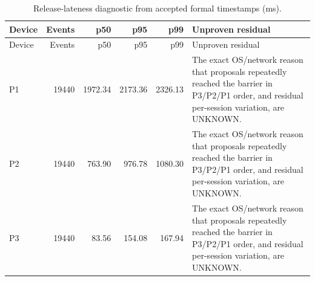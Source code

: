 \begin{longtable}{lrrrrp{65mm}}
\caption{Release-lateness diagnostic from accepted formal timestamps (ms).}\label{tab:release}\\
\toprule
Device & Events & p50 & p95 & p99 & Unproven residual \\
\midrule
\endfirsthead
\toprule
Device & Events & p50 & p95 & p99 & Unproven residual \\
\midrule
\endhead
P1 & 19440 & 1972.34 & 2173.36 & 2326.13 & The exact OS/network reason that proposals repeatedly reached the barrier in P3/P2/P1 order, and residual per-session variation, are UNKNOWN. \\
P2 & 19440 & 763.90 & 976.78 & 1080.30 & The exact OS/network reason that proposals repeatedly reached the barrier in P3/P2/P1 order, and residual per-session variation, are UNKNOWN. \\
P3 & 19440 & 83.56 & 154.08 & 167.94 & The exact OS/network reason that proposals repeatedly reached the barrier in P3/P2/P1 order, and residual per-session variation, are UNKNOWN. \\
\bottomrule
\end{longtable}
